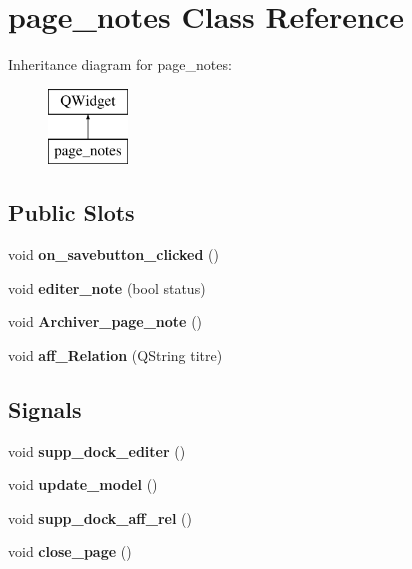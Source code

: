 \hypertarget{classpage__notes}{}\section{page\+\_\+notes Class Reference}
\label{classpage__notes}
Inheritance diagram for page\+\_\+notes\+:\begin{figure}[H]
\begin{center}
\leavevmode
\includegraphics[height=2.000000cm]{classpage__notes}
\end{center}
\end{figure}
\subsection*{Public Slots}
\begin{DoxyCompactItemize}
\item 
\mbox{\label{classpage__notes_a4d2e70a79da90f0d27331ba989140e05}} 
void {\bfseries on\+\_\+savebutton\+\_\+clicked} ()
\item 
\mbox{\label{classpage__notes_a882eeafe3e68fd54648719624fed2345}} 
void {\bfseries editer\+\_\+note} (bool status)
\item 
\mbox{\label{classpage__notes_a143159873c27f4c3eeee183d031274fb}} 
void {\bfseries Archiver\+\_\+page\+\_\+note} ()
\item 
\mbox{\label{classpage__notes_af0db24bdc1f7bff2398f78a0c32fc51f}} 
void {\bfseries aff\+\_\+\+Relation} (Q\+String titre)
\end{DoxyCompactItemize}
\subsection*{Signals}
\begin{DoxyCompactItemize}
\item 
\mbox{\label{classpage__notes_a5b8f0db068908857d83afa630b8e4a86}} 
void {\bfseries supp\+\_\+dock\+\_\+editer} ()
\item 
\mbox{\label{classpage__notes_ab0e939533b6d2ceea5c94d7c4739e0cb}} 
void {\bfseries update\+\_\+model} ()
\item 
\mbox{\label{classpage__notes_ac0ee46fc4c828960556fff31762fcffa}} 
void {\bfseries supp\+\_\+dock\+\_\+aff\+\_\+rel} ()
\item 
\mbox{\label{classpage__notes_a53cde94ca69c6d560578b53560e72170}} 
void {\bfseries close\+\_\+page} ()
\end{DoxyCompactItemize}

